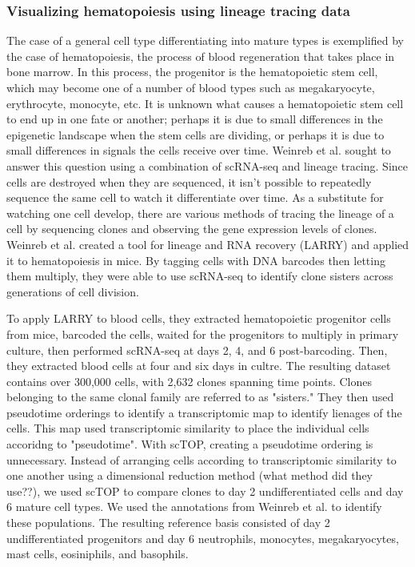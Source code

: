 \documentclass[aps,superscriptaddress, notitlepage,longbibliography]{revtex4-1}
\begin{document}
\subsubsection{Visualizing hematopoiesis using lineage tracing data}

The case of a general cell type differentiating into mature types is exemplified by the case of hematopoiesis, the process of blood regeneration that takes place in bone marrow. In this process, the progenitor is the hematopoietic stem cell, which may become one of a number of blood types such as megakaryocyte, erythrocyte, monocyte, etc. It is unknown what causes a hematopoietic stem cell to end up in one fate or another; perhaps it is due to small differences in the epigenetic landscape when the stem cells are dividing, or perhaps it is due to small differences in signals the cells receive over time. Weinreb et al. \cite{weinreb_lineage_2020} sought to answer this question using a combination of scRNA-seq and lineage tracing. Since cells are destroyed when they are sequenced, it isn't possible to repeatedly sequence the same cell to watch it differentiate over time. As a substitute for watching one cell develop, there are various methods of tracing the lineage of a cell by sequencing clones and observing the gene expression levels of clones. Weinreb et al. created a tool for lineage and RNA recovery (LARRY) and applied it to hematopoiesis in mice. By tagging cells with DNA barcodes then letting them multiply, they were able to use scRNA-seq to identify clone sisters across generations of cell division.

To apply LARRY to blood cells, they extracted hematopoietic progenitor cells from mice, barcoded the cells, waited for the progenitors to multiply in primary culture, then performed scRNA-seq at days 2, 4, and 6 post-barcoding. Then, they extracted blood cells at four and six days in cultre. The resulting dataset contains over 300,000 cells, with 2,632 clones spanning time points. Clones belonging to the same clonal family are referred to as "sisters." They then used pseudotime orderings to identify a transcriptomic map to identify lienages of the cells. This map used transcriptomic similarity to place the individual cells accoridng to "pseudotime". With scTOP, creating a pseudotime ordering is unnecessary. Instead of arranging cells according to transcriptomic similarity to one another using a dimensional reduction method (what method did they use??), we used scTOP to compare clones to day 2 undifferentiated cells and day 6 mature cell types. We used the annotations from Weinreb et al. to identify these populations. The resulting reference basis consisted of day 2 undifferentiated progenitors and day 6 neutrophils, monocytes, megakaryocytes, mast cells, eosiniphils, and basophils. 
\end{document}
